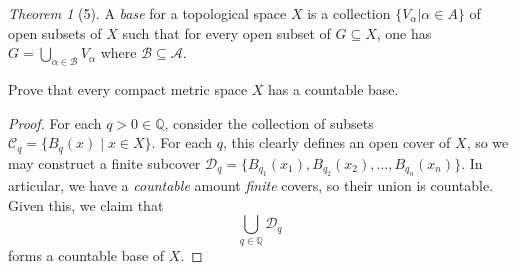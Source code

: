 \documentclass[12pt]{article}
\theoremstyle{remark}
\theoremstyle{named}
\newtheorem*{theorem}{Theorem}
\begin{document}
\begin{theorem}[5]
    A \textit{base} for a topological space \(X\) is a collection \(\{V_{\alpha} | \alpha \in A\}\) of open subsets of \(X\) such that for every open subset of \(G \subseteq X\), one has \(G = \bigcup_{\alpha \in \mathcal B} V_{\alpha}\) where \(\mathcal B \subseteq \mathcal A\).

    Prove that every compact metric space \(X\) has a countable base.
\end{theorem}

\begin{proof}
    For each \(q > 0 \in \mathbb Q\), consider the collection of subsets \(\mathcal C_q = \{B_q(x) \mid x \in X\}\). For each \(q\), this clearly defines an open cover of \(X\), so we may construct a finite subcover \(\mathcal D_q = \{B_{q_1}(x_1), B_{q_2}(x_2), \dots, B_{q_n}(x_n)\}\). In articular, we have a \textit{countable} amount \textit{finite} covers, so their union is countable. Given this, we claim that 
    \[\bigcup_{q \in \mathbb Q} \mathcal D_q\]
    forms a countable base of \(X\). 
\end{proof}
\end{document}
